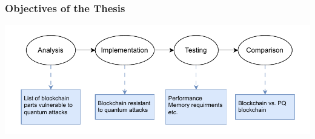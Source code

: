 








\begin{frame}
  \frametitle{Objectives of the Thesis}
  \centering
  \includegraphics[width=\textwidth]{img/flow.pdf}
\end{frame}



